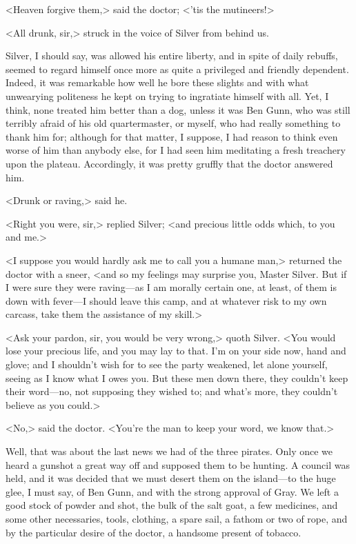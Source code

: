 <Heaven forgive them,> said the doctor; <'tis the mutineers!>

<All drunk, sir,> struck in the voice of Silver from behind us.

Silver, I should say, was allowed his entire liberty, and in spite of daily rebuffs, seemed to regard himself once more as quite a privileged and friendly dependent. Indeed, it was remarkable how well he bore these slights and with what unwearying politeness he kept on trying to ingratiate himself with all. Yet, I think, none treated him better than a dog, unless it was Ben Gunn, who was still terribly afraid of his old quartermaster, or myself, who had really something to thank him for; although for that matter, I suppose, I had reason to think even worse of him than anybody else, for I had seen him meditating a fresh treachery upon the plateau. Accordingly, it was pretty gruffly that the doctor answered him.

<Drunk or raving,> said he.

<Right you were, sir,> replied Silver; <and precious little odds which, to you and me.>

<I suppose you would hardly ask me to call you a humane man,> returned the doctor with a sneer, <and so my feelings may surprise you, Master Silver. But if I were sure they were raving—as I am morally certain one, at least, of them is down with fever—I should leave this camp, and at whatever risk to my own carcass, take them the assistance of my skill.>

<Ask your pardon, sir, you would be very wrong,> quoth Silver. <You would lose your precious life, and you may lay to that. I'm on your side now, hand and glove; and I shouldn't wish for to see the party weakened, let alone yourself, seeing as I know what I owes you. But these men down there, they couldn't keep their word—no, not supposing they wished to; and what's more, they couldn't believe as you could.>

<No,> said the doctor. <You're the man to keep your word, we know that.>

Well, that was about the last news we had of the three pirates. Only once we heard a gunshot a great way off and supposed them to be hunting. A council was held, and it was decided that we must desert them on the island—to the huge glee, I must say, of Ben Gunn, and with the strong approval of Gray. We left a good stock of powder and shot, the bulk of the salt goat, a few medicines, and some other necessaries, tools, clothing, a spare sail, a fathom or two of rope, and by the particular desire of the doctor, a handsome present of tobacco.


